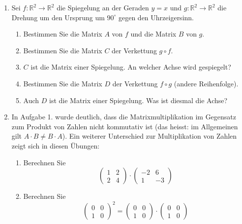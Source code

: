 \clearpage
\begin{ueb}
    {}{}
    \begin{enumerate}
        \item Sei \( f: \mathbb{R}^2 \to \mathbb{R}^2 \) die Spiegelung an der Geraden \( y = x \) und \( g: \mathbb{R}^2 \to \mathbb{R}^2 \) die Drehung um den Ursprung um \( 90^\circ \) gegen den Uhrzeigersinn.
        \begin{enumerate}
            \item Bestimmen Sie die Matrix \( A \) von \( f \) und die Matrix \( B \) von \( g \).
            \item Bestimmen Sie die Matrix \( C \) der Verkettung \( g \circ f \).
            \item \( C \) ist die Matrix einer Spiegelung. An welcher Achse wird gespiegelt?
            \item Bestimmen Sie die Matrix \( D \) der Verkettung \( f \circ g \) (andere Reihenfolge).
            \item Auch \( D \) ist die Matrix einer Spiegelung. Was ist diesmal die Achse?
        \end{enumerate}
    
        \item In Aufgabe 1. wurde deutlich, dass die Matrixmultiplikation im Gegensatz zum Produkt von Zahlen nicht kommutativ ist (das heisst: im Allgemeinen gilt \( A \cdot B \neq B \cdot A \)).
        Ein weiterer Unterschied zur Multiplikation von Zahlen zeigt sich in diesen Übungen:
        \begin{enumerate}
            \item Berechnen Sie  
            \[
            \begin{pmatrix} 1 & 2 \\ 2 & 4 \end{pmatrix} 
            \cdot 
            \begin{pmatrix} -2 & 6 \\ 1 & -3 \end{pmatrix}
            \]
            \item Berechnen Sie  
            \[
            \begin{pmatrix} 0 & 0 \\ 1 & 0 \end{pmatrix}^2 
            =
            \begin{pmatrix} 0 & 0 \\ 1 & 0 \end{pmatrix} 
            \cdot 
            \begin{pmatrix} 0 & 0 \\ 1 & 0 \end{pmatrix}
            \]
        \end{enumerate}
    

\end{enumerate}
\end{ueb}
